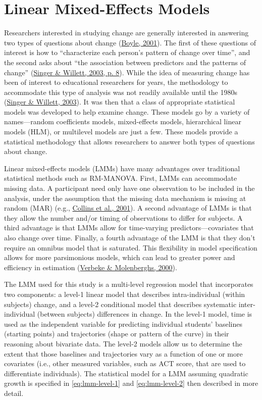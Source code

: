 \documentclass[11pt]{umnthesis}
\begin{document}
\hypertarget{linear-mixed-effects-models}{%
\section{Linear Mixed-Effects Models}\label{linear-mixed-effects-models}}

Researchers interested in studying change are generally interested in answering two types of questions about change (\protect\hyperlink{ref-boyle:2001}{Boyle, 2001}). The first of these questions of interest is how to ``characterize each person's pattern of change over time'', and the second asks about ``the association between predictors and the patterns of change'' (\protect\hyperlink{ref-singer:2003}{Singer \& Willett, 2003, p. 8}). While the idea of measuring change has been of interest to educational researchers for years, the methodology to accommodate this type of analysis was not readily available until the 1980s (\protect\hyperlink{ref-singer:2003}{Singer \& Willett, 2003}). It was then that a class of appropriate statistical models was developed to help examine change. These models go by a variety of names---random coefficients models, mixed-effects models, hierarchical linear models (HLM), or multilevel models are just a few. These models provide a statistical methodology that allows researchers to answer both types of questions about change.

Linear mixed-effects models (LMMs) have many advantages over traditional statistical methods such as RM-MANOVA. First, LMMs can accommodate missing data. A participant need only have one observation to be included in the analysis, under the assumption that the missing data mechanism is missing at random (MAR) (e.g., \protect\hyperlink{ref-collins:2001}{Collins et al., 2001}). A second advantage of LMMs is that they allow the number and/or timing of observations to differ for subjects. A third advantage is that LMMs allow for time-varying predictors---covariates that also change over time. Finally, a fourth advantage of the LMM is that they don't require an omnibus model that is saturated. This flexibility in model specification allows for more parsimonious models, which can lead to greater power and efficiency in estimation (\protect\hyperlink{ref-verbeke:2000}{Verbeke \& Molenberghs, 2000}).

The LMM used for this study is a multi-level regression model that incorporates two components: a level-1 linear model that describes intra-individual (within subjects) change, and a level-2 conditional model that describes systematic inter-individual (between subjects) differences in change. In the level-1 model, time is used as the independent variable for predicting individual students' baselines (starting points) and trajectories (shape or pattern of the curve) in their reasoning about bivariate data. The level-2 models allow us to determine the extent that those baselines and trajectories vary as a function of one or more covariates (i.e., other measured variables, such as ACT score, that are used to differentiate individuals). The statistical model for a LMM assuming quadratic growth is specified in \autoref{eq:lmm-level-1} and \autoref{eq:lmm-level-2} then described in more detail.
\end{document}
